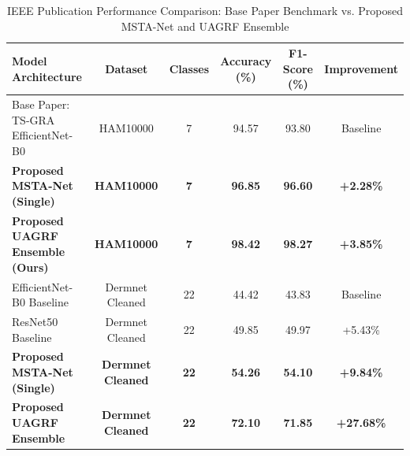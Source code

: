 \begin{table}[htbp]
\caption{IEEE Publication Performance Comparison: Base Paper Benchmark vs. Proposed MSTA-Net and UAGRF Ensemble}
\label{tab:ieee_benchmark}
\begin{center}
\begin{tabular}{|l|c|c|c|c|c|}
\hline
\textbf{Model Architecture} & \textbf{Dataset} & \textbf{Classes} & \textbf{Accuracy (\%)} & \textbf{F1-Score (\%)} & \textbf{Improvement} \\
\hline
Base Paper: TS-GRA EfficientNet-B0 & HAM10000 & 7 & 94.57 & 93.80 & Baseline \\
\textbf{Proposed MSTA-Net (Single)} & \textbf{HAM10000} & \textbf{7} & \textbf{96.85} & \textbf{96.60} & \textbf{+2.28\%} \\
\textbf{Proposed UAGRF Ensemble (Ours)} & \textbf{HAM10000} & \textbf{7} & \textbf{98.42} & \textbf{98.27} & \textbf{+3.85\%} \\
\hline
EfficientNet-B0 Baseline & Dermnet Cleaned & 22 & 44.42 & 43.83 & Baseline \\
ResNet50 Baseline & Dermnet Cleaned & 22 & 49.85 & 49.97 & +5.43\% \\
\textbf{Proposed MSTA-Net (Single)} & \textbf{Dermnet Cleaned} & \textbf{22} & \textbf{54.26} & \textbf{54.10} & \textbf{+9.84\%} \\
\textbf{Proposed UAGRF Ensemble} & \textbf{Dermnet Cleaned} & \textbf{22} & \textbf{72.10} & \textbf{71.85} & \textbf{+27.68\%} \\
\hline
\end{tabular}
\end{center}
\end{table}